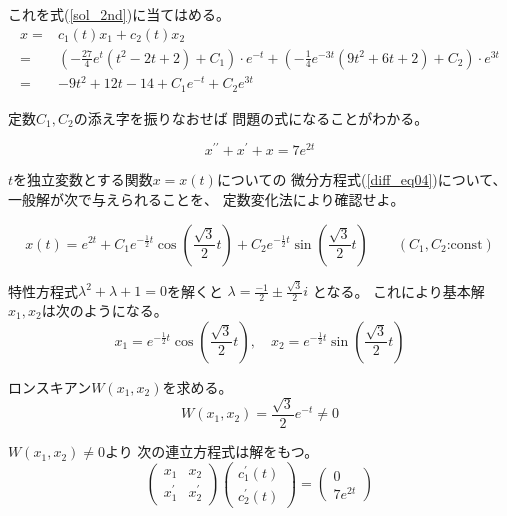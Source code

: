 \documentclass[12pt,b5paper]{ltjsarticle}
\begin{document}
これを式(\ref{sol_2nd})に当てはめる。
\begin{align}
 x =& c_1(t)x_1+c_2(t)x_2\\
 =& \left( -\frac{27}{4}e^{t} (t^{2} - 2t + 2) +C_1 \right) \cdot e^{-t}
 + \left( -\frac{1}{4}e^{-3t} (9t^{2} + 6t + 2) +C_2 \right)\cdot e^{3t}\\
 =& -9t^2+12t-14+C_1e^{-t}+C_2e^{3t}
\end{align}

定数$C_1,C_2$の添え字を振りなおせば
問題の式になることがわかる。


\hrulefill

\begin{equation}
 x^{\prime\prime}+x^{\prime}+x=7e^{2t}
  \label{diff_eq04}
\end{equation}

$t$を独立変数とする関数$x=x(t)$についての
微分方程式(\ref{diff_eq04})について、
一般解が次で与えられることを、
定数変化法により確認せよ。

\begin{equation}
 x(t)=e^{2t}
  +C_1e^{-\frac{1}{2}t}\cos{\left(\frac{\sqrt{3}}{2}t\right)}
  +C_2e^{-\frac{1}{2}t}\sin{\left(\frac{\sqrt{3}}{2}t\right)}
  \qquad
  (C_1,C_2\text{:const})
\end{equation}


\dotfill

特性方程式$\lambda^2+\lambda+1=0$を解くと
$\displaystyle \lambda = \frac{-1}{2}\pm\frac{\sqrt{3}}{2}i$
となる。
これにより基本解$x_1,x_2$は次のようになる。
\begin{equation}
 x_1= e^{-\frac{1}{2}t}\cos{\left(\frac{\sqrt{3}}{2}t\right)}
  ,\quad
 x_2= e^{-\frac{1}{2}t}\sin{\left(\frac{\sqrt{3}}{2}t\right)}
\end{equation}

ロンスキアン$W(x_1,x_2)$を求める。
\begin{equation}
 W(x_1,x_2)
  = \frac{\sqrt{3}}{2}  e^{-t}\ne 0
\end{equation}

$W(x_1,x_2)\ne 0$より
次の連立方程式は解をもつ。
\begin{equation}
 \begin{pmatrix}
   x_1 & x_2\\
   x_1^{\prime} & x_2^{\prime}
 \end{pmatrix}
 \begin{pmatrix}
  c_1^{\prime}(t) \\ c_2^{\prime}(t)
 \end{pmatrix}
 =
 \begin{pmatrix}
  0 \\ 7e^{2t}
 \end{pmatrix}
\end{equation}
\end{document}
